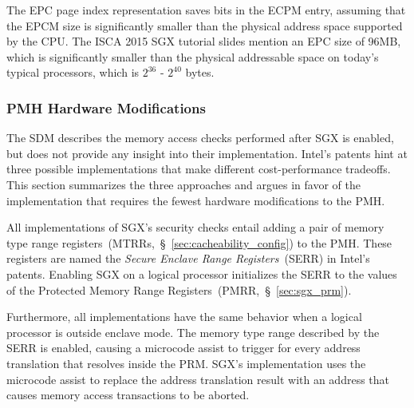 
The EPC page index representation saves bits in the ECPM entry, assuming that
the EPCM size is significantly smaller than the physical address space
supported by the CPU. The ISCA 2015 SGX tutorial slides mention an EPC size of
96MB, which is significantly smaller than the physical addressable space on
today's typical processors, which is $2^{36}$ - $2^{40}$ bytes.


\subsubsection{PMH Hardware Modifications}
\label{sec:sgx_pmh_hardware}


The SDM describes the memory access checks performed after SGX is enabled, but
does not provide any insight into their implementation. Intel's patents hint at
three possible implementations that make different cost-performance tradeoffs.
This section summarizes the three approaches and argues in favor of the
implementation that requires the fewest hardware modifications to the PMH.

All implementations of SGX's security checks entail adding a pair of memory
type range registers~(MTRRs,~\S~\ref{sec:cacheability_config}) to the PMH.
These registers are named the \textit{Secure Enclave Range Registers}~(SERR)
in Intel's patents.  Enabling SGX on a logical processor initializes the SERR
to the values of the Protected Memory Range
Registers~(PMRR,~\S~\ref{sec:sgx_prm}).

Furthermore, all implementations have the same behavior when a logical
processor is outside enclave mode. The memory type range described by the SERR
is enabled, causing a microcode assist to trigger for every address translation
that resolves inside the PRM. SGX's implementation uses the microcode assist to
replace the address translation result with an address that causes memory
access transactions to be aborted.

